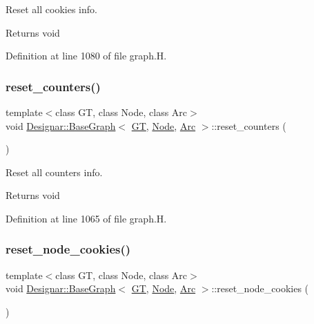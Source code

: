 Reset all cookies info. 

\begin{DoxyReturn}{Returns}
void 
\end{DoxyReturn}


Definition at line 1080 of file graph.\+H.

\mbox{\label{class_designar_1_1_base_graph_a881c342d8f25d43f995ccfdf876622e1}} 
\subsubsection{\texorpdfstring{reset\+\_\+counters()}{reset\_counters()}}
{\footnotesize\ttfamily template$<$class GT, class Node, class Arc$>$ \\
void \hyperlink{class_designar_1_1_base_graph}{Designar\+::\+Base\+Graph}$<$ \hyperlink{demo-buildgraph_8_c_a3001c40d2c31ca87ed96cd7d1334a55e}{GT}, \hyperlink{namespace_designar_a5af326c65aa2bd26b26c410f2030d09e}{Node}, \hyperlink{namespace_designar_a3f55fb5513d62ff47cbc8f72b8e95d6f}{Arc} $>$\+::reset\+\_\+counters (\begin{DoxyParamCaption}{ }\end{DoxyParamCaption})\hspace{0.3cm}{\ttfamily [inline]}}



Reset all counters info. 

\begin{DoxyReturn}{Returns}
void 
\end{DoxyReturn}


Definition at line 1065 of file graph.\+H.

\mbox{\label{class_designar_1_1_base_graph_ab797f80e7efa5a6d0b33f925d6079c18}} 
\subsubsection{\texorpdfstring{reset\+\_\+node\+\_\+cookies()}{reset\_node\_cookies()}}
{\footnotesize\ttfamily template$<$class GT, class Node, class Arc$>$ \\
void \hyperlink{class_designar_1_1_base_graph}{Designar\+::\+Base\+Graph}$<$ \hyperlink{demo-buildgraph_8_c_a3001c40d2c31ca87ed96cd7d1334a55e}{GT}, \hyperlink{namespace_designar_a5af326c65aa2bd26b26c410f2030d09e}{Node}, \hyperlink{namespace_designar_a3f55fb5513d62ff47cbc8f72b8e95d6f}{Arc} $>$\+::reset\+\_\+node\+\_\+cookies (\begin{DoxyParamCaption}{ }\end{DoxyParamCaption})\hspace{0.3cm}{\ttfamily [inline]}}



